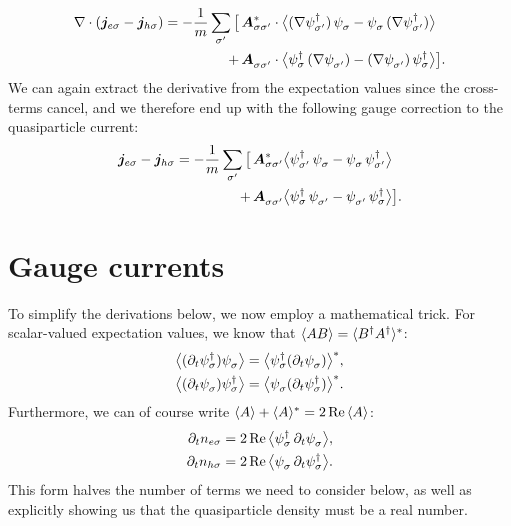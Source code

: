 \begin{align}
  \nabla \cdot (\bm{j}_{e\sigma} - \bm{j}_{h\sigma}) =
  -\frac{1}{m} \sum_{\sigma'}
  \big[ 
   \, & \cc{\bm{A}_{\sigma\sigma'}} \cdot \avg[\big]{(\nabla \hc{\psi_{\sigma'}})\, \pc{\psi_{\sigma}} - \pc{\psi_{\sigma}}\, (\nabla \hc{\psi_{\sigma'}})} \\
  +\, & \pc{\bm{A}_{\sigma\sigma'}} \cdot \avg[\big]{ \hc{\psi_{\sigma}}\, (\nabla \pc{\psi_{\sigma'}}) - (\nabla \pc{\psi_{\sigma'}})\, \hc{\psi_{\sigma}}}
  \big].
\end{align}
We can again extract the derivative from the expectation values since the cross-terms cancel, and we therefore end up with the following gauge correction to the quasiparticle current:
\begin{align}
  \bm{j}_{e\sigma} - \bm{j}_{h\sigma} =
  -\frac{1}{m} \sum_{\sigma'}
  \big[ 
   \, & \cc{\bm{A}_{\sigma\sigma'}} \avg[\big]{ \hc{\psi_{\sigma'}}\, \pc{\psi_{\sigma}} - \pc{\psi_{\sigma}}\, \hc{\psi_{\sigma'}}} \\
  +\, & \pc{\bm{A}_{\sigma\sigma'}} \avg[\big]{ \hc{\psi_{\sigma}}\, \pc{\psi_{\sigma'}} - \pc{\psi_{\sigma'}}\, \hc{\psi_{\sigma}}}
  \big].
\end{align}










\clearpage
\section{Gauge currents}
To simplify the derivations below, we now employ a mathematical trick.
For scalar-valued expectation values, we know that $\langle AB \rangle = \langle B^\dagger A^\dagger \rangle^*$:
\begin{align}
  \avg[\big]{(\p{t}  \hc{\psi_\sigma}) \pc{\psi_\sigma}} &= \cc{\avg[\big]{\hc{\psi_\sigma} (\p{t} \pc{\psi_\sigma}) }}, \\
  \avg[\big]{(\p{t}  \pc{\psi_\sigma}) \hc{\psi_\sigma}} &= \cc{\avg[\big]{\pc{\psi_\sigma} (\p{t} \hc{\psi_\sigma}) }}.
\end{align}
Furthermore, we can of course write $\langle A \rangle+\langle A \rangle^{\ast} = 2\operatorname{Re}{\langle A \rangle}$:
\begin{align}
  \p t n_{e\sigma} &= 2 \re
  \avg[\big]{\hc{\psi_{\sigma}}\, \p t \pc{\psi_{\sigma}}} , \\
  \p t n_{h\sigma} &= 2 \re
  \avg[\big]{\pc{\psi_{\sigma}}\, \p t \hc{\psi_{\sigma}}} .
\end{align}
This form halves the number of terms we need to consider below, as well as explicitly showing us that the quasiparticle density must be a real number.

